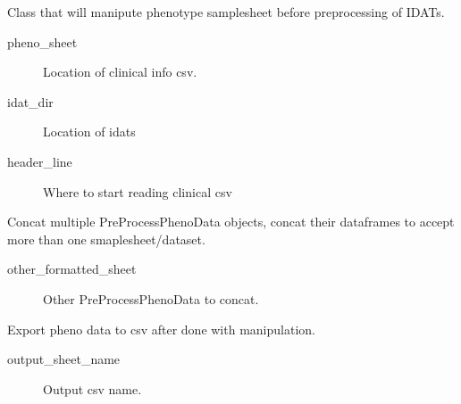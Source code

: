 \documentclass[letterpaper,10pt,english]{sphinxmanual}
\begin{document}
\begin{fulllineitems}
\label{\detokenize{index:pymethylprocess.PreProcessDataTypes.PreProcessPhenoData}}
Class that will manipute phenotype samplesheet before preprocessing of IDATs.
\begin{description}
\item[{pheno\_sheet}] \leavevmode
Location of clinical info csv.

\item[{idat\_dir}] \leavevmode
Location of idats

\item[{header\_line}] \leavevmode
Where to start reading clinical csv

\end{description}

\begin{fulllineitems}
\label{\detokenize{index:pymethylprocess.PreProcessDataTypes.PreProcessPhenoData.concat}}
Concat multiple PreProcessPhenoData objects, concat their dataframes to accept more than one smaplesheet/dataset.
\begin{description}
\item[{other\_formatted\_sheet}] \leavevmode
Other PreProcessPhenoData to concat.

\end{description}

\end{fulllineitems}


\begin{fulllineitems}
\label{\detokenize{index:pymethylprocess.PreProcessDataTypes.PreProcessPhenoData.export}}
Export pheno data to csv after done with manipulation.
\begin{description}
\item[{output\_sheet\_name}] \leavevmode
Output csv name.


\end{description}
\end{fulllineitems}
\end{fulllineitems}
\end{document}
